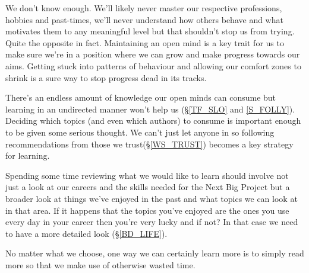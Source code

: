 \cleardoublepage
{\small

We don't know enough. We'll likely never master our respective professions, hobbies and past-times, we'll never understand how others behave and what motivates them to any meaningful level but that shouldn't stop us from trying. Quite the opposite in fact. Maintaining an open mind is a key trait for us to make sure we're in a position where we can grow and make progress towards our aims. Getting stuck into patterns of behaviour and allowing our comfort zones to shrink is a sure way to stop progress dead in its tracks.

There's an endless amount of knowledge our open minds can consume but learning in an undirected manner won't help us (\S  \ref{TF_SLO} and \ref{S_FOLLY}). 
Deciding which topics (and even which authors) to consume is important enough to be given some serious thought. We can't just let anyone in so following recommendations from those we trust(\S \ref{WS_TRUST}) becomes a key strategy for learning.

Spending some time reviewing what we would like to learn should involve not just a look at our careers and the skills needed for the Next Big Project but a broader look at things we've enjoyed in the past and what topics we can look at in that area. If it happens that the topics you've enjoyed are the ones you use every day in your career then you're very lucky and if not? In that case we need to have a more detailed look (\S \ref{BD_LIFE}).

No matter what we choose, one way we can certainly learn more is to simply read more so that we make use of otherwise wasted time. 

}
